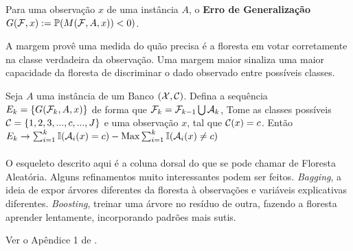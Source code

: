  
  \begin{defi}
 Para uma observação $x$ de uma instância $A$, o \textbf{Erro de Generalização} $G(\mathcal{F}, x) := \mathbb{P} (M(\mathcal{F}, A, x)) < 0)$.  \end{defi}
  
  A margem provê uma medida do quão precisa é a floresta em votar corretamente na classe verdadeira da observação. Uma margem maior sinaliza uma maior capacidade da floresta de discriminar o dado observado entre possíveis classes.  

 \begin{teo} Seja $A$ uma instância de um Banco $(\mathcal{X}, \mathcal{C})$. Defina a sequência $E_k = \{ G(\mathcal{F}_k, A, x) \}$ de forma que $\mathcal{F}_k = \mathcal{F}_{k-1} \bigcup \mathcal{A}_k $,  Tome as classes possíveis $\mathcal{C} = \{1,2,3,...,c,...,J \}$ e uma observação $x$, tal que $\mathcal{C}(x) = c$. Então $E_k \to \sum_{i=1}^k \mathbb{I} ( \mathcal{A}_i (x) = c ) - \underset{}{\text{Max}} \sum_{i=1}^k \mathbb{I}  ( \mathcal{A}_i (x) \neq c) $
 
 \end{teo}
 
 O esqueleto descrito aqui é a coluna dorsal do que se pode chamar de Floresta Aleatória. Alguns refinamentos muito interessantes podem ser feitos. \textit{Bagging}, a ideia de expor árvores diferentes da floresta à observações e variáveis explicativas diferentes. \textit{Boosting}, treinar uma árvore no resíduo de outra, fazendo a floresta aprender lentamente, incorporando padrões mais sutis. 
 
 
 
 \begin{prova}
 Ver o Apêndice 1 de . \blacksquare
 \end{prova}
